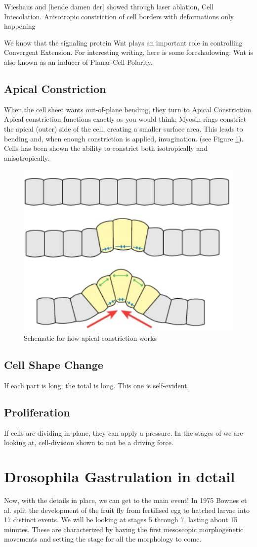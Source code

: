 Wieshaus and [hende damen der] showed through laser ablation, Cell Intecolation. Anisotropic constriction of cell borders with deformations only happening  



We know that the signaling protein Wnt plays an important role in controlling Convergent Extension. For interesting writing, here is some foreshadowing: Wnt is also known as an inducer of Planar-Cell-Polarity.

\subsection{ Apical Constriction }
When the cell sheet wants out-of-plane bending, they turn to Apical Constriction. Apical constriction functions exactly as you would think; Myosin rings constrict the apical (outer) side of the cell, creating a smaller surface area. This leads to bending and, when enough constriction is applied, invagination. (see Figure \ref{fig:apical-constriction}). Cells has been shown the ability to constrict both isotropically and anisotropically.

\begin{figure}[H]
    \centering
    \includegraphics[width=0.3\linewidth]{chapters/Theory/figures/apical_constriction_schematic.png}
    \caption{Schematic for how apical constriction works}
    \label{fig:apical-constriction}
\end{figure}


\subsection{Cell Shape Change}
If each part is long, the total is long. This one is self-evident.
\subsection{Proliferation}
If cells are dividing in-plane, they can apply a pressure. In the stages of we are looking at, cell-division shown to not be a driving force.


\section{Drosophila Gastrulation in detail}
Now, with the details in place, we can get to the main event!
In 1975 Bownes et al. split the development of the fruit fly from fertilised egg to hatched larvae into 17 distinct events. \cite{bownes1975photographic} We will be looking at stages 5 through 7, lasting about 15 minutes. These are characterized by having the first mesoscopic morphogenetic movements and setting the stage for all the morphology to come. 

